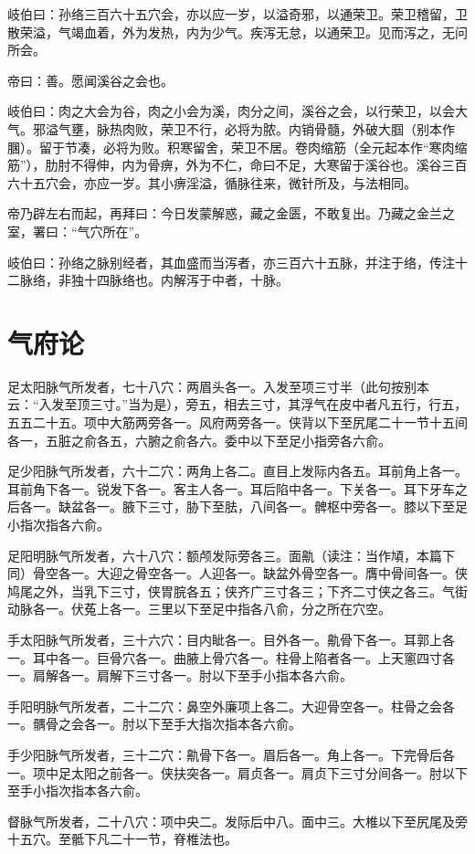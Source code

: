\documentclass{article}%
\begin{document}
岐伯曰：孙络三百六十五穴会，亦以应一岁，以溢奇邪，以通荣卫。荣卫稽留，卫散荣溢，气竭血着，外为发热，内为少气。疾泻无怠，以通荣卫。见而泻之，无问所会。

帝曰：善。愿闻溪谷之会也。

岐伯曰：肉之大会为谷，肉之小会为溪，肉分之间，溪谷之会，以行荣卫，以会大气。邪溢气壅，脉热肉败，荣卫不行，必将为脓。内销骨髓，外破大腘（别本作䐃）。留于节凑，必将为败。积寒留舍，荣卫不居。卷肉缩筋（全元起本作“寒肉缩筋”），肋肘不得伸，内为骨痹，外为不仁，命曰不足，大寒留于溪谷也。溪谷三百六十五穴会，亦应一岁。其小痹淫溢，循脉往来，微针所及，与法相同。

帝乃辟左右而起，再拜曰：今日发蒙解惑，藏之金匮，不敢复出。乃藏之金兰之室，署曰：“气穴所在”。

岐伯曰：孙络之脉别经者，其血盛而当泻者，亦三百六十五脉，并注于络，传注十二脉络，非独十四脉络也。内解泻于中者，十脉。
\section{气府论}
足太阳脉气所发者，七十八穴：两眉头各一。入发至项三寸半（此句按别本云：“入发至顶三寸。”当为是），旁五，相去三寸，其浮气在皮中者凡五行，行五，五五二十五。项中大筋两旁各一。风府两旁各一。侠背以下至尻尾二十一节十五间各一，五脏之俞各五，六腑之俞各六。委中以下至足小指旁各六俞。

足少阳脉气所发者，六十二穴：两角上各二。直目上发际内各五。耳前角上各一。耳前角下各一。锐发下各一。客主人各一。耳后陷中各一。下关各一。耳下牙车之后各一。缺盆各一。腋下三寸，胁下至胠，八间各一。髀枢中旁各一。膝以下至足小指次指各六俞。

足阳明脉气所发者，六十八穴：额颅发际旁各三。面鼽（读注：当作頄，本篇下同）骨空各一。大迎之骨空各一。人迎各一。缺盆外骨空各一。膺中骨间各一。侠鸠尾之外，当乳下三寸，侠胃脘各五；侠齐广三寸各三；下齐二寸侠之各三。气街动脉各一。伏菟上各一。三里以下至足中指各八俞，分之所在穴空。

手太阳脉气所发者，三十六穴：目内眦各一。目外各一。鼽骨下各一。耳郭上各一。耳中各一。巨骨穴各一。曲腋上骨穴各一。柱骨上陷者各一。上天窻四寸各一。肩解各一。肩解下三寸各一。肘以下至手小指本各六俞。

手阳明脉气所发者，二十二穴：鼻空外廉项上各二。大迎骨空各一。柱骨之会各一。髃骨之会各一。肘以下至手大指次指本各六俞。

手少阳脉气所发者，三十二穴：鼽骨下各一。眉后各一。角上各一。下完骨后各一。项中足太阳之前各一。侠扶突各一。肩贞各一。肩贞下三寸分间各一。肘以下至手小指次指本各六俞。

督脉气所发者，二十八穴：项中央二。发际后中八。面中三。大椎以下至尻尾及旁十五穴。至骶下凡二十一节，脊椎法也。
\end{document}
